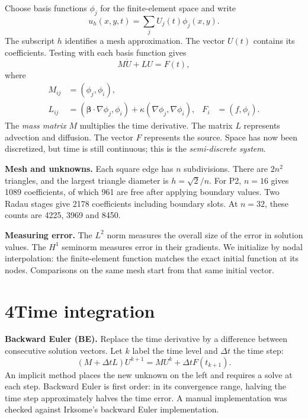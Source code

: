 \documentclass[11pt,a4paper]{article}
\begin{document}
Choose basis functions $\phi_j$ for the finite-element space and write
\begin{equation}
u_h(x,y,t)=\sum_j U_j(t)\phi_j(x,y).
\end{equation}
The subscript $h$ identifies a mesh approximation. The vector $U(t)$ contains its coefficients. Testing with each basis function gives
\begin{equation}
\boxed{M\dot U+LU=F(t)},
\end{equation}
where
\begin{align}
M_{ij}&=(\phi_j,\phi_i),\nonumber\\
L_{ij}&=(\boldsymbol\beta\cdot\nabla\phi_j,\phi_i)
                  +\kappa(\nabla\phi_j,\nabla\phi_i),& F_i&=(f,\phi_i).
\end{align}
The \emph{mass matrix} $M$ multiplies the time derivative. The matrix $L$ represents advection and diffusion. The vector $F$ represents the source. Space has now been discretized, but time is still continuous; this is the \emph{semi-discrete system}.

\textbf{Mesh and unknowns.} Each square edge has $n$ subdivisions. There are $2n^2$ triangles, and the largest triangle diameter is $h=\sqrt2/n$. For P2, $n=16$ gives 1089 coefficients, of which 961 are free after applying boundary values. Two Radau stages give 2178 coefficients including boundary slots. At $n=32$, these counts are 4225, 3969 and 8450.

\textbf{Measuring error.} The $L^2$ norm measures the overall size of the error in solution values. The $H^1$ seminorm measures error in their gradients. We initialize by nodal interpolation: the finite-element function matches the exact initial function at its nodes. Comparisons on the same mesh start from that same initial vector.

\newpage
\section*{4\quad Time integration}
\textbf{Backward Euler (BE).} Replace the time derivative by a difference between consecutive solution vectors. Let $k$ label the time level and $\Delta t$ the time step:
\begin{equation}
(M+\Delta t L)U^{k+1}=MU^k+\Delta t F(t_{k+1}).
\end{equation}
An implicit method places the new unknown on the left and requires a solve at each step. Backward Euler is first order: in its convergence range, halving the time step approximately halves the time error. A manual implementation was checked against Irksome's backward Euler implementation.
\end{document}
